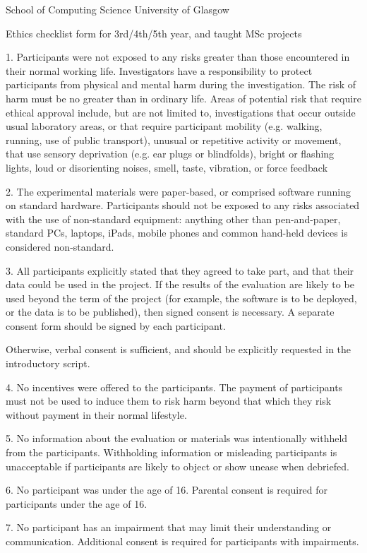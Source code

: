 \documentclass{l4proj}
\begin{document}
\begin{appendices}
School of Computing Science
University of Glasgow

Ethics checklist form for 3rd/4th/5th year, and taught MSc projects

1.	Participants were not exposed to any risks greater than those encountered in their normal working life.
Investigators have a responsibility to protect participants from physical and mental harm during the investigation. The risk of harm must be no greater than in ordinary life. Areas of potential risk that require ethical approval include, but are not limited to, investigations that occur outside usual laboratory areas, or that require participant mobility (e.g. walking, running, use of public transport), unusual or repetitive activity or movement, that use sensory deprivation (e.g. ear plugs or blindfolds), bright or flashing lights, loud or disorienting noises, smell, taste, vibration, or force feedback

2.	The experimental materials were paper-based, or comprised software running on standard hardware.
Participants should not be exposed to any risks associated with the use of non-standard equipment: anything other than pen-and-paper, standard PCs, laptops, iPads, mobile phones and common hand-held devices is considered non-standard.

3.	All participants explicitly stated that they agreed to take part, and that their data could be used in the project.
If the results of the evaluation are likely to be used beyond the term of the project (for example, the software is to be deployed, or the data is to be published), then signed consent is necessary. A separate consent form should be signed by each participant.

Otherwise, verbal consent is sufficient, and should be explicitly requested in the introductory script.

4.	No incentives were offered to the participants.
The payment of participants must not be used to induce them to risk harm beyond that which they risk without payment in their normal lifestyle. 
 

5.	No information about the evaluation or materials was intentionally withheld from the participants.
Withholding information or misleading participants is unacceptable if participants are likely to object or show unease when debriefed. 

6.	No participant was under the age of 16.
Parental consent is required for participants under the age of 16. 

7.	No participant has an impairment that may limit their understanding or communication.
Additional consent is required for participants with impairments. 


\end{appendices}
\end{document}
